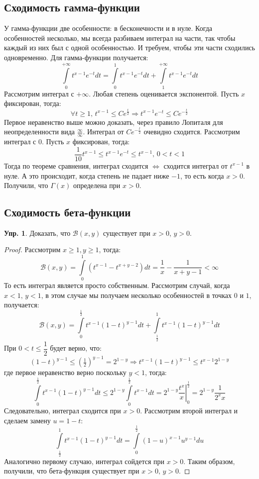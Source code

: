 \documentclass[12pt]{article}
\newcommand{\MB}{\mathcal{B}}
\theoremstyle{definition}
\newtheorem{exrc}{Упр.}
\newcommand{\ddint}[2]{\displaystyle\int\limits_{#1}^{#2}}
\begin{document}
\subsection*{Сходимость гамма-функции}
У гамма-функции две особенности: в бесконечности и в нуле. Когда особенностей несколько, мы всегда разбиваем интеграл на части, так чтобы каждый из них был с одной особенностью. И требуем, чтобы эти части сходились одновременно. Для гамма-функции получается:
$$
	\ddint{0}{+\infty}t^{x-1}e^{-t}dt = \ddint{0}{1}t^{x-1}e^{-t}dt + \ddint{1}{+\infty}t^{x-1}e^{-t}dt
$$
Рассмотрим интеграл с ${+\infty}$. Любая степень оценивается экспонентой. Пусть $x$ фиксирован, тогда:
$$
	\forall t \geq 1, \, t^{x-1} \leq Ce^{\tfrac{t}{2}} \Rightarrow t^{x-1}e^{-t} \leq Ce^{-\tfrac{t}{2}}
$$
Первое неравенство выше можно доказать, через правило Лопиталя для неопределенности вида $\tfrac{\infty}{\infty}$. Интеграл от $Ce^{-\tfrac{t}{2}}$ очевидно сходится. Рассмотрим интеграл с $0$. Пусть $x$ фиксирован, тогда:
$$
	\dfrac{1}{10}t^{x-1} \leq t^{x-1}e^{-t} \leq t^{x-1}, \,  0 < t < 1
$$
Тогда по теореме сравнения, интеграл сходится $\Leftrightarrow$ сходится интеграл от $t^{x-1}$ в нуле. А это происходит, когда  степень не падает ниже $-1$, то есть когда $x > 0$. Получили, что $\Gamma(x)$ определена при $x > 0$.

\subsection*{Сходимость бета-функции}
\begin{exrc}
	Доказать, что $\MB(x,y)$ существует при $x > 0$, $y >0$.
\end{exrc}
\begin{proof}
	Рассмотрим $x \geq 1, y \geq 1$, тогда:
	$$
		\MB(x,y) = \ddint{0}{1}\left(t^{x-1} - t^{x + y - 2}\right)dt = \dfrac{1}{x} - \dfrac{1}{x + y - 1} < \infty 
	$$
	То есть интеграл является просто собственным. Рассмотрим случай, когда $x < 1, \, y < 1$, в этом случае мы получаем несколько особенностей в точках $0$ и $1$, получается:
	$$
		\MB(x,y) = \ddint{0}{\tfrac{1}{2}}t^{x-1}(1 - t)^{y-1}dt + \ddint{\tfrac{1}{2}}{1}t^{x-1}(1 - t)^{y-1}dt
	$$
	При $0 < t \leq \dfrac{1}{2}$ будет верно, что: 
	$$
		(1 - t)^{y - 1} \leq \left(\tfrac{1}{2}\right)^{y-1} = 2^{1- y} \Rightarrow t^{x-1}(1 - t)^{y - 1} \leq t^{x-1}2^{1-y}
	$$ 
	где первое неравенство верно поскольку $y<1$, тогда:
	$$
		\ddint{0}{\tfrac{1}{2}}t^{x-1}(1 - t)^{y-1}dt \leq 2^{1- y} \ddint{0}{\tfrac{1}{2}}t^{x-1}dt = 2^{1-y}\left.\dfrac{t^x}{x}\right|_0^{\tfrac{1}{2}} = 2^{1-y}\dfrac{1}{2^x x}
	$$
	Следовательно, интеграл сходится при $x > 0$. Рассмотрим второй интеграл и сделаем замену $u = 1 - t$:
	$$
		\ddint{\tfrac{1}{2}}{1}t^{x-1}(1 - t)^{y-1}dt = \ddint{0}{\tfrac{1}{2}}(1 - u)^{x-1}u^{y-1}du
	$$
	Аналогично первому случаю, интеграл сойдется при $x > 0$. Таким образом, получили, что бета-функция существует при $x > 0, \, y > 0$.
\end{proof}
\end{document}

